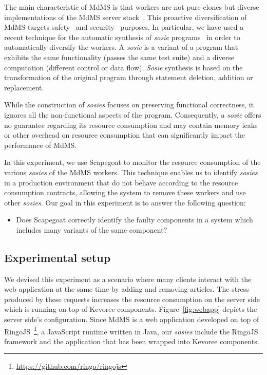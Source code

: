 The main characteristic of MdMS is that workers are not pure clones but diverse implementations of the MdMS server stack~\cite{alliermulti}.
This proactive diversification of MdMS targets safety~\cite{avizienis85} and security~\cite{Forrest97} purposes.
In particular, we have used a recent technique for the automatic synthesis of \textit{sosie} programs~\cite{baudry2014tailored} in order to automatically diversify the workers. 
A \textit{sosie} is a variant of a program that exhibits the same functionality (passes the same test suite) and a diverse computation (different control or data flow). 
\textit{Sosie} synthesis is based on the transformation of the original program through statement deletion, addition or replacement.

While the construction of \textit{sosies} focuses on preserving functional correctness, it ignores all the non-functional aspects of the program.
Consequently, a \textit{sosie} offers no guarantee regarding its resource consumption and may contain memory leaks or other overhead on resource consumption that can significantly impact the performance of MdMS.

In this experiment, we use Scapegoat to monitor the resource consumption of the various \textit{sosies} of the MdMS workers.
This technique enables us to identify \textit{sosies} in a production environment that do not behave according to the resource consumption contracts, allowing the system to remove these workers and use other \textit{sosies}.
Our goal in this experiment is to answer the following question:

\begin{itemize}
 \item Does Scapegoat correctly identify the faulty components in a system which includes many variants of the same component?   
\end{itemize}

\subsection{Experimental setup}

We devised this experiment as a scenario where many clients interact with the web application at the same time by adding and removing articles.
The stress produced by these requests increases the resource consumption on the server side which is running on top of Kevoree components.
Figure~\ref{fig:webapp} depicts the server side's configuration.
Since MdMS is a web application developed on top of RingoJS~\footnote{\url{https://github.com/ringo/ringojs}}, a JavaScript runtime written in Java, our \textit{sosies} include the RingoJS framework and the application that has been wrapped into Kevoree components.

